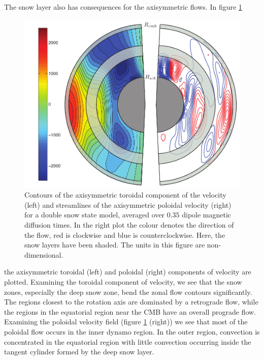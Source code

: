 The snow layer also has consequences for the axisymmetric flows. In figure \ref{fig:uax}
\begin{figure}
	\centering
	\noindent\includegraphics[width=.6\linewidth]{Chapter4/figures/uxtpavg19_043_2460-2530}
	\caption{Contours of the axisymmetric toroidal component of the velocity (left) and streamlines of the axisymmetric poloidal velocity (right) for a double snow state model, averaged over $0.35$ dipole magnetic diffusion times. In the right plot the colour denotes the direction of the flow, red is clockwise and blue is counterclockwise. Here, the snow layers have been shaded. The units in this figure are non-dimensional.}
	\label{fig:uax}
\end{figure}
 the axisymmetric toroidal (left) and poloidal (right) components of velocity are plotted. Examining the toroidal component of velocity, we see that the snow zones, especially the deep snow zone, bend the zonal flow contours significantly. The regions closest to the rotation axis are dominated by a retrograde flow, while the regions in the equatorial region near the CMB have an overall prograde flow. Examining the poloidal velocity field (figure \ref{fig:uax} (right)) we see that most of the poloidal flow occurs in the inner dynamo region. In the outer region, convection is concentrated in the equatorial region with little convection occurring inside the tangent cylinder formed by the deep snow layer. 

